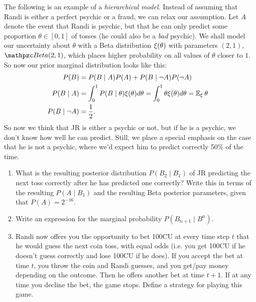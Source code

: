 \documentclass[twoside,a4paper]{article}
\begin{document}
\begin{exercise}
  The following is an example of a \emph{hierarchical model.}
  Instead of assuming that Randi is either a perfect psychic or a fraud, we can relax our assumption. Let $A$ denote the event that Randi is psychic, but that he can only predict some proportion $\theta \in [0,1]$ of tosses (he could also be a \emph{bad} psychic).
We shall model our uncertainty about $\theta$ with a Beta distribution $\xi(\theta)$ with parameters $(2, 1)$, $\Beta(2,1)$, which places higher probability on all values of $\theta$ closer to $1$. So now our prior marginal distribution looks like this:
\begin{align}
  P(B) &= P(B \mid A) P(A) + P(B \mid \neg A) P(\neg A)\\
  P(B \mid A) &= \int_0^1 P(B \mid \theta) \xi(\theta) d\theta = \int_0^1 \theta \xi(\theta) d\theta = \mathop{\mbox{\ensuremath{\mathbb{E}}}}\nolimits_\xi \theta\\
  P(B \mid \neg A) &= \frac{1}{2}.
\end{align}
So now we think that JR is either a psychic or not, but if he is a psychic, we don't know how well he can predict. Still, we place a special emphasis on the case that he is not a psychic, where we'd expect him to predict correctly 50\% of the time.
\begin{enumerate}
\item What is the resulting posterior distribution $P(B_2 \mid B_1)$ of JR predicting the next toss correctly after he has predicted one correctly? Write this in terms of the resulting $P(A \mid B_1)$ and the resulting Beta posterior parameters, given that $P(A) = 2^{-16}$.
\item Write an expression for the marginal probability $P(B_{n+1} \mid B^n)$.
\item Randi now offers you the opportunity to bet 100CU at every time step $t$ that he would guess the next coin toss, with equal odds (i.e. you get 100CU if he doesn't guess correctly and lose 100CU if he does). If you accept the bet at time $t$, you throw the coin and Randi guesses, and you get/pay money depending on the outcome. Then he offers another bet at time $t+1$. If at any time you decline the bet, the game stops. Define a strategy for playing this game.
\end{enumerate}

\end{exercise}
\end{document}
